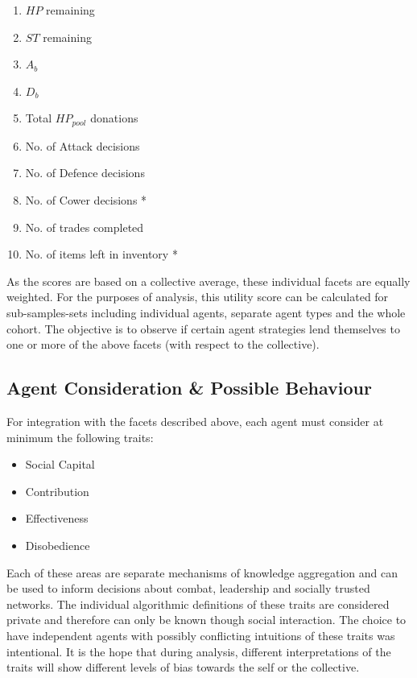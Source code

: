 \begin{enumerate}
    \item $HP$ remaining
    \item $ST$ remaining
    \item $A_b$
    \item $D_b$
    \item Total $HP_{pool}$ donations 
    \item No. of Attack decisions
    \item No. of Defence decisions
    \item No. of Cower decisions * 
    \item No. of trades completed
    \item No. of items left in inventory *
\end{enumerate}

As the scores are based on a collective average, these individual facets are equally weighted. For the purposes of analysis, this utility score can be calculated for sub-samples-sets including individual agents, separate agent types and the whole cohort. The objective is to observe if certain agent strategies lend themselves to one or more of the above facets (with respect to the collective). 


\subsection{Agent Consideration \& Possible Behaviour}\label{sec: behaviour}


For integration with the facets described above, each agent must consider at minimum the following traits:

\begin{itemize}
    \item Social Capital
    \item Contribution
    \item Effectiveness
    \item Disobedience 
\end{itemize}

Each of these areas are separate mechanisms of knowledge aggregation and can be used to inform decisions about combat, leadership and socially trusted networks. The individual algorithmic definitions of these traits are considered private and therefore can only be known though social interaction. The choice to have independent agents with possibly conflicting intuitions of these traits was intentional. It is the hope that during analysis, different interpretations of the traits will show different levels of bias towards the self or the collective. 


